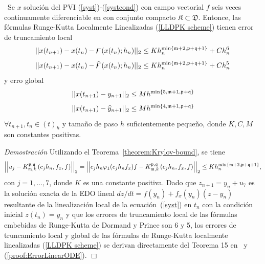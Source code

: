 \begin{theorem}\label{theorem:lldp-convergence}
	\cite{naranjo2021locally}~Se $x$ solución del PVI (\ref{syst})-(\ref{systcond}) con campo vectorial $f$ seis veces continuamente diferenciable en con conjunto compacto $\mathfrak{K} \subset \mathfrak{D}$. Entonce, las fórmulas Runge-Kutta Localmente Linealizadas (\ref{LLDPK scheme}) tienen error de truncamiento local
	\[\lvert\lvert x(t_{n+1}) - x(t_n) - \digamma(x(t_n);h_n) \rvert\rvert_2 \leq Kh_n^{\mathrm{min}\left\{ \mathfrak{m}+2,\mathfrak{p}+\mathfrak{q}+1 \right\}}+C h_n^{6}  \]
	\[\lvert\lvert x(t_{n+1}) - x(t_n) - \widehat{\digamma }(x(t_n);h_n) \rvert\rvert_2 \leq Kh_n^{\mathrm{min}\left\{ \mathfrak{m}+2,\mathfrak{p}+\mathfrak{q}+1 \right\}}+C h_n^{5}  \]
	y erro global
	\[ \lvert\lvert x(t_{n+1}) - y_{n+1} \rvert\rvert_2 \leq M h^{\mathrm{min}\left\{5,\mathfrak{m}+1,\mathfrak{p}+\mathfrak{q} \right\}} \]
	\[ \lvert\lvert x(t_{n+1}) - \widehat{y}_{n+1} \rvert\rvert_2 \leq M h^{\mathrm{min}\left\{ 4,\mathfrak{m}+1,\mathfrak{p}+\mathfrak{q} \right\}} \]
	$\forall t_{n+1},t_n\in(t)_h$ y tamaño de paso $h$ suficientemente pequeño, donde  $K,C,M$ son constantes positivas.
\end{theorem}
\emph{Demostración} Utilizando el Teorema~\ref{theorem:Krylov-bound}, se tiene
\begin{equation}\label{proof:ErrorLinearODE}
\left\lvert \left\lvert  u_j-K_{\mathfrak{m},k}^{\mathfrak{p},\mathfrak{q}}\left(c_j h_n,f_x , f \right)  \right\rvert \right\rvert_2 =  \left\lvert \left\lvert c_jh_n\varphi_1(c_jh_nf_x)f - K_{\mathfrak{m},k}^{\mathfrak{p},\mathfrak{q}}\left(c_j h_n, f_x , f \right)  \right\rvert \right\rvert_2 \le Kh_n^{\mathrm{min}\left\{ \mathfrak{m}+2,\mathfrak{p}+\mathfrak{q}+1 \right\}},
\end{equation}
con $j=1,\ldots,7$, donde $K$ es una constante positiva. Dado que $z_{n+1} = y_n + u_7$ es la solución exacta de la EDO lineal $dz/dt=f(y_n)+f_x(y_n)(z-y_n)$ resultante de la linealización local de la ecuación~(\ref{syst}) en $t_n$ con la condición inicial $z(t_n)=y_n$ y que los errores de truncamiento local de las fórmulas embebidas de Runge-Kutta de Dormand y Prince son 6 y 5, los errores de truncamiento local y global de las fórmulas de Runge-Kutta localmente linealizadas (\ref{LLDPK scheme}) se derivan directamente del Teorema 15 en~\cite{Jimenez13} y (\ref{proof:ErrorLinearODE}). $\Box$\\

